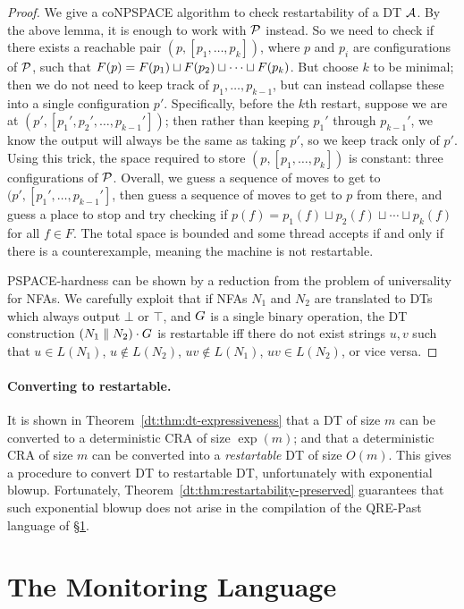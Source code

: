 \begin{proof}
We give a coNPSPACE algorithm to check restartability of a DT $\mathcal{A}$. By the above lemma, it is enough to work with $\mathcal{P}$ instead.
So we need to check if there exists
a reachable pair $(p, [p_1,\ldots,p_k])$,
where $p$ and $p_i$ are configurations of $\mathcal{P}$,
such that
$F(p) = F(p_1) \sqcup F(p_2) \sqcup \cdots \sqcup F(p_k)$.
But choose $k$ to be minimal;
then we do not need to keep track of $p_1, \ldots, p_{k-1}$,
but can instead collapse these into a single configuration $p'$.
Specifically, before the $k$th restart,
suppose we are at $(p', [p_1',p_2',\ldots, p_{k-1}'])$;
then rather than keeping $p_1'$ through $p_{k-1}'$,
we know the output will always be the same as taking $p'$,
so we keep track only of $p'$.
Using this trick, the space required to store
$(p, [p_1, \ldots, p_k])$ is constant: three configurations of $\mathcal{P}$.
Overall, we guess a sequence of moves to get
to $(p', [p_1', \ldots, p_{k-1}']$,
then guess a sequence of moves to get to $p$ from there,
and guess a place to stop and try checking if
$p(f) = p_1(f) \sqcup p_2(f) \sqcup \cdots \sqcup p_k(f)$ for all $f \in F$.
The total space is bounded and some thread accepts if and only if there is a counterexample,
meaning the machine is not restartable.

PSPACE-hardness can be shown by a reduction from the problem of universality for NFAs.
We carefully exploit that if
NFAs $N_1$ and $N_2$ are translated to DTs which always output $\bot$ or $\top$,
and $G$ is a single binary operation,
the DT construction $(N_1 \; \| \; N_2) \cdot G$ is restartable iff
there do not exist strings $u, v$ such that
$u \in L(N_1)$, $u \notin L(N_2)$, $uv \notin L(N_1)$, $uv \in L(N_2)$, or vice versa.
\end{proof}

\paragraph*{Converting to restartable.}
It is shown in Theorem~\ref{dt:thm:dt-expressiveness} that a DT of size $m$ can be converted to a deterministic CRA of size $\exp(m)$; and that a deterministic CRA of size $m$ can be converted into a \emph{restartable} DT of size $O(m)$. This gives a procedure to convert DT to restartable DT, unfortunately with exponential blowup. Fortunately, Theorem~\ref{dt:thm:restartability-preserved} guarantees that such exponential blowup does not arise in the compilation of the QRE-Past language of \S\ref{dt:sec:rm}.

\section{The \QREpast{} Monitoring Language}
\label{dt:sec:rm}

